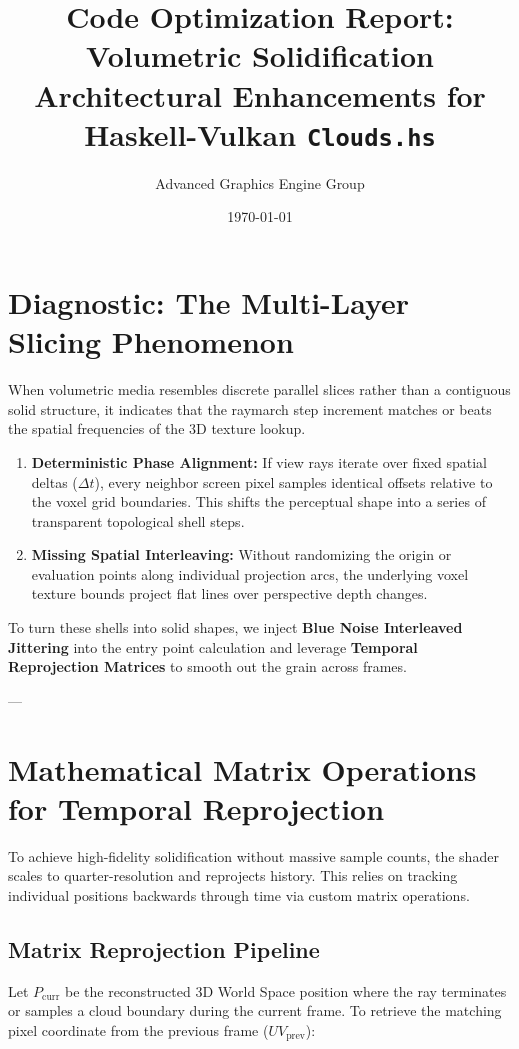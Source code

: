 \documentclass[11pt,a4paper]{article}
\title{Code Optimization Report: Volumetric Solidification \\ \large Architectural Enhancements for Haskell-Vulkan \texttt{Clouds.hs}}
\author{Advanced Graphics Engine Group}
\date{\today}
\begin{document}
\maketitle

\section{Diagnostic: The Multi-Layer Slicing Phenomenon}
When volumetric media resembles discrete parallel slices rather than a contiguous solid structure, it indicates that the raymarch step increment matches or beats the spatial frequencies of the 3D texture lookup. 

\begin{enumerate}
    \item \textbf{Deterministic Phase Alignment:} If view rays iterate over fixed spatial deltas ($\Delta t$), every neighbor screen pixel samples identical offsets relative to the voxel grid boundaries. This shifts the perceptual shape into a series of transparent topological shell steps.
    \item \textbf{Missing Spatial Interleaving:} Without randomizing the origin or evaluation points along individual projection arcs, the underlying voxel texture bounds project flat lines over perspective depth changes.
\end{enumerate}

To turn these shells into solid shapes, we inject \textbf{Blue Noise Interleaved Jittering} into the entry point calculation and leverage \textbf{Temporal Reprojection Matrices} to smooth out the grain across frames.

---

\section{Mathematical Matrix Operations for Temporal Reprojection}
To achieve high-fidelity solidification without massive sample counts, the shader scales to quarter-resolution and reprojects history. This relies on tracking individual positions backwards through time via custom matrix operations.

\subsection{Matrix Reprojection Pipeline}
Let $P_{\text{curr}}$ be the reconstructed 3D World Space position where the ray terminates or samples a cloud boundary during the current frame. To retrieve the matching pixel coordinate from the previous frame ($UV_{\text{prev}}$):
\end{document}
